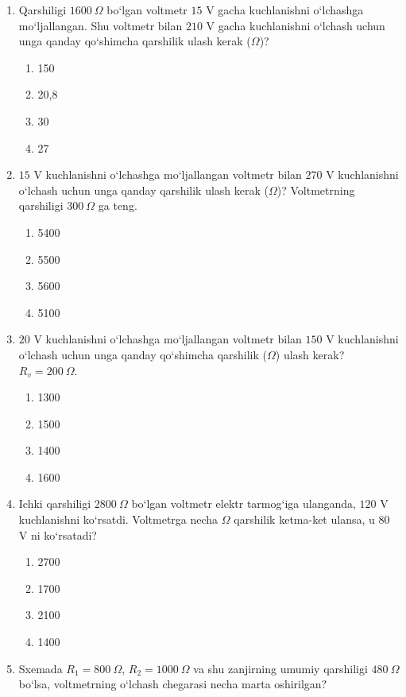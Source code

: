 \begin{enumerate}
\item Qarshiligi $1600~\Omega$ bo‘lgan voltmetr $15$ V gacha kuchlanishni o‘lchashga mo‘ljallangan. Shu voltmetr bilan $210$ V gacha kuchlanishni o‘lchash uchun unga qanday qo‘shimcha qarshilik ulash kerak ($\Omega$)?
\begin{enumerate}[label=\Alph*)]
\item 150
\item 20,8
\item 30
\item 27
\end{enumerate}

\item $15$ V kuchlanishni o‘lchashga mo‘ljallangan voltmetr bilan $270$ V kuchlanishni o‘lchash uchun unga qanday qarshilik ulash kerak ($\Omega$)? Voltmetrning qarshiligi $300~\Omega$ ga teng.
\begin{enumerate}[label=\Alph*)]
\item 5400
\item 5500
\item 5600
\item 5100
\end{enumerate}

\item $20$ V kuchlanishni o‘lchashga mo‘ljallangan voltmetr bilan $150$ V kuchlanishni o‘lchash uchun unga qanday qo‘shimcha qarshilik ($\Omega$) ulash kerak? $R_v=200~\Omega$.
\begin{enumerate}[label=\Alph*)]
\item 1300
\item 1500
\item 1400
\item 1600
\end{enumerate}

\item Ichki qarshiligi $2800~\Omega$ bo‘lgan voltmetr elektr tarmog‘iga ulanganda, $120$ V kuchlanishni ko‘rsatdi. Voltmetrga necha $\Omega$ qarshilik ketma-ket ulansa, u $80$ V ni ko‘rsatadi?
\begin{enumerate}[label=\Alph*)]
\item 2700
\item 1700
\item 2100
\item 1400
\end{enumerate}

\item Sxemada $R_1=800~\Omega$, $R_2=1000~\Omega$ va shu zanjirning umumiy qarshiligi $480~\Omega$ bo‘lsa, voltmetrning o‘lchash chegarasi necha marta oshirilgan?


\end{enumerate}
